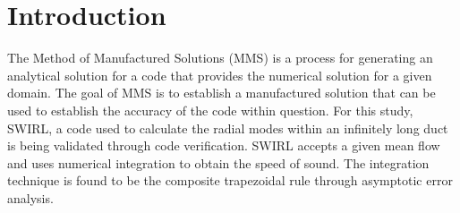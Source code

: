 
\section{Introduction}
The Method of Manufactured Solutions (MMS) is a process for generating an 
analytical solution for a code that provides the numerical solution for a 
given domain. The goal of MMS is to establish a manufactured solution that can 
be used to establish the accuracy of the code within question. For this study, 
SWIRL, a code used to calculate the radial modes within an infinitely long duct
is being validated through code verification. SWIRL accepts a given mean flow and 
uses numerical integration to obtain the speed of sound. The integration technique
is found to be the composite trapezoidal rule through asymptotic error analysis.

